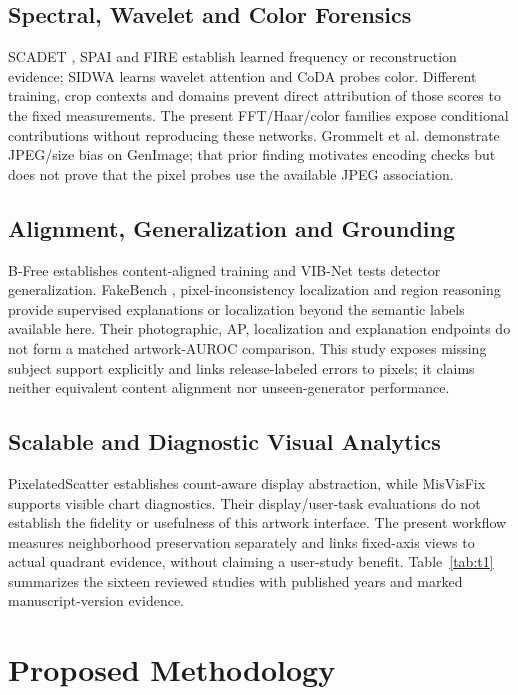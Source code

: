 \documentclass[journal,twoside,web]{IEEEtran}
\begin{document}
\subsection{Spectral, Wavelet and Color Forensics}
SCADET \cite{p4}, SPAI \cite{p5} and FIRE \cite{p6} establish learned frequency or reconstruction evidence; SIDWA \cite{p14} learns wavelet attention and CoDA \cite{p8} probes color. Different training, crop contexts and domains prevent direct attribution of those scores to the fixed measurements. The present FFT/Haar/color families expose conditional contributions without reproducing these networks. Grommelt et al. \cite{jpeg_bias} demonstrate JPEG/size bias on GenImage; that prior finding motivates encoding checks but does not prove that the pixel probes use the available JPEG association.

\subsection{Alignment, Generalization and Grounding}
B-Free \cite{p3} establishes content-aligned training and VIB-Net \cite{p7} tests detector generalization. FakeBench \cite{p12}, pixel-inconsistency localization \cite{p13} and region reasoning \cite{p15} provide supervised explanations or localization beyond the semantic labels available here. Their photographic, AP, localization and explanation endpoints do not form a matched artwork-AUROC comparison. This study exposes missing subject support explicitly and links release-labeled errors to pixels; it claims neither equivalent content alignment nor unseen-generator performance.

\subsection{Scalable and Diagnostic Visual Analytics}
PixelatedScatter \cite{p9} establishes count-aware display abstraction, while MisVisFix \cite{p10} supports visible chart diagnostics. Their display/user-task evaluations do not establish the fidelity or usefulness of this artwork interface. The present workflow measures neighborhood preservation separately and links fixed-axis views to actual quadrant evidence, without claiming a user-study benefit. Table~\ref{tab:t1} summarizes the sixteen reviewed studies with published years and marked manuscript-version evidence.



\section{Proposed Methodology}
\end{document}
